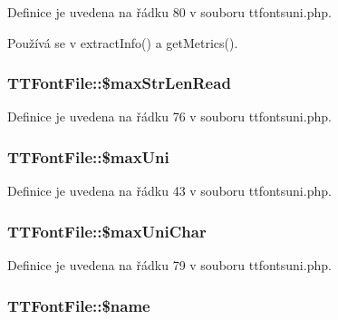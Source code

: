 Definice je uvedena na řádku 80 v souboru ttfontsuni.\-php.



Používá se v extract\-Info() a get\-Metrics().

\hypertarget{class_t_t_font_file_a4fdd9e97b4e35f76777b99dd1e3044ad}{
\subsubsection[{\$max\-Str\-Len\-Read}]{\setlength{\rightskip}{0pt plus 5cm}T\-T\-Font\-File\-::\$max\-Str\-Len\-Read}}\label{class_t_t_font_file_a4fdd9e97b4e35f76777b99dd1e3044ad}


Definice je uvedena na řádku 76 v souboru ttfontsuni.\-php.

\hypertarget{class_t_t_font_file_af8a3bab707cc25f67f9734c7c922ff19}{
\subsubsection[{\$max\-Uni}]{\setlength{\rightskip}{0pt plus 5cm}T\-T\-Font\-File\-::\$max\-Uni}}\label{class_t_t_font_file_af8a3bab707cc25f67f9734c7c922ff19}


Definice je uvedena na řádku 43 v souboru ttfontsuni.\-php.

\hypertarget{class_t_t_font_file_a5dd59179fe1e63aec4bcdad449cf09f9}{
\subsubsection[{\$max\-Uni\-Char}]{\setlength{\rightskip}{0pt plus 5cm}T\-T\-Font\-File\-::\$max\-Uni\-Char}}\label{class_t_t_font_file_a5dd59179fe1e63aec4bcdad449cf09f9}


Definice je uvedena na řádku 79 v souboru ttfontsuni.\-php.

\hypertarget{class_t_t_font_file_a84e12a70d07814f6b0999ee9c195501b}{
\subsubsection[{\$name}]{\setlength{\rightskip}{0pt plus 5cm}T\-T\-Font\-File\-::\$name}}\label{class_t_t_font_file_a84e12a70d07814f6b0999ee9c195501b}


